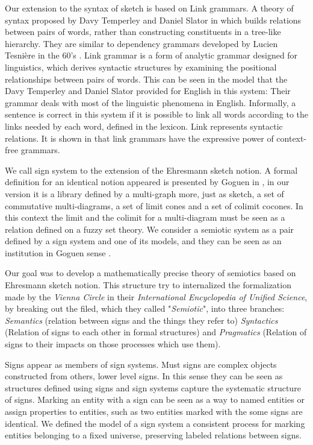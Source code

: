\documentclass[oribibl]{llncs}
\begin{document}
Our extension to the syntax of sketch is based on Link grammars. A
theory of syntax proposed by Davy Temperley and Daniel Slator in
\cite{Sleator91} which builds relations between pairs of words,
rather than constructing constituents in a tree-like hierarchy. They
are similar to dependency grammars developed by Lucien Tesni\`{e}re
in the 60's \cite{Tesniere59}. Link grammar is a form of analytic grammar designed for linguistics, which derives syntactic structures by  examining the
positional relationships between pairs of words. This can be seen in
the model that the Davy Temperley and Daniel Slator provided
for English in this system: Their grammar deals with most of the
linguistic phenomena in English. Informally, a sentence is correct
in this system if it is possible to link all words according to the
links needed by each word, defined in the lexicon. Link represents
syntactic relations. It is shown in \cite{Sleator91} that link
grammars have the expressive power of context-free grammars.


We call sign system to the extension of the Ehresmann sketch notion.
A formal definition for an identical notion appeared is presented by Goguen in
\cite{Gog??}, in our version it is a library defined by a
multi-graph more, just as sketch, a set of commutative multi-diagrams, a
set of limit cones and a set of colimit cocones. In this context the limit and the colimit for a multi-diagram must be seen as a relation defined on a fuzzy set theory. We consider a semiotic system as a pair defined by a
sign system and one of its models, and they can be seen as an institution in Goguen sense \cite{goguen83}.

Our goal was to develop a mathematically precise theory of semiotics based on Ehresmann sketch notion. This structure try to internalized the formalization made by the \emph{Vienna Circle} in their \emph{International Encyclopedia of Unified Science}, by breaking out the filed, which they called "\emph{Semiotic}", into three branches: \emph{Semantics} (relation between signs and the things they refer to) \emph{Syntactics} (Relation of signs to each other in formal structures) and \emph{Pragmatics} (Relation of signs to their impacts on those processes which use them).

Signs appear as members of sign systems. Must signs are complex objects constructed from others, lower level signs. In this sense they can be seen as structures defined using signs and sign systems capture the systematic structure of signs. Marking an entity with a sign can be seen as a way to named entities or assign properties to entities, such as two entities marked with the some signs are identical. We defined the model of a sign system a consistent process for marking entities belonging to a fixed universe, preserving labeled relations between signs.
\end{document}

